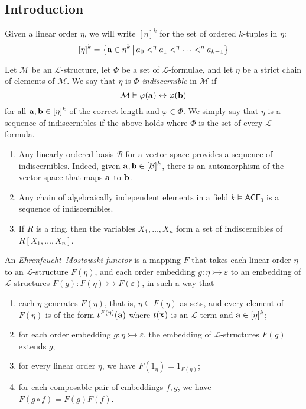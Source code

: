 \subsection{Introduction}
Given a linear order \( \eta \), we will write \( [\eta]^k \) for the set of ordered \( k \)-tuples in \( \eta \):
\[ [\eta]^k = \qty{\vb a \in \eta^k \,\middle|\,a_0 <^\eta a_1 <^\eta \dots <^\eta a_{k-1}} \]
\begin{definition}
	Let \( \mathcal M \) be an \( \mathcal L \)-structure, let \( \Phi \) be a set of \( \mathcal L \)-formulae, and let \( \eta \) be a strict chain of elements of \( \mathcal M \).
	We say that \( \eta \) is \emph{\( \Phi \)-indiscernible} in \( \mathcal M \) if
	\[ \mathcal M \vDash \varphi(\vb a) \leftrightarrow \varphi(\vb b) \]
	for all \( \vb a, \vb b \in [\eta]^k \) of the correct length and \( \varphi \in \Phi \).
	We simply say that \( \eta \) is a sequence of indiscernibles if the above holds where \( \Phi \) is the set of every \( \mathcal L \)-formula.
\end{definition}
\begin{example}
	\begin{enumerate}
		\item Any linearly ordered basis \( \mathcal B \) for a vector space provides a sequence of indiscernibles.
			Indeed, given \( \vb a, \vb b \in [\mathcal B]^k \), there is an automorphism of the vector space that maps \( \vb a \) to \( \vb b \).
		\item Any chain of algebraically independent elements in a field \( k \vDash \mathsf{ACF}_0 \) is a sequence of indiscernibles.
		\item If \( R \) is a ring, then the variables \( X_1, \dots, X_n \) form a set of indiscernibles of \( R[X_1, \dots, X_n] \).
	\end{enumerate}
\end{example}
\begin{definition}
	An \emph{Ehrenfeucht--Mostowski functor} is a mapping \( F \) that takes each linear order \( \eta \) to an \( \mathcal L \)-structure \( F(\eta) \), and each order embedding \( g : \eta \rightarrowtail \varepsilon \) to an embedding of \( \mathcal L \)-structures \( F(g) : F(\eta) \rightarrowtail F(\varepsilon) \), in such a way that
	\begin{enumerate}
		\item each \( \eta \) generates \( F(\eta) \), that is, \( \eta \subseteq F(\eta) \) as sets, and every element of \( F(\eta) \) is of the form \( t^{F(\eta)}(\vb a) \) where \( t(\vb x) \) is an \( \mathcal L \)-term and \( \vb a \in [\eta]^k \);
		\item for each order embedding \( g : \eta \rightarrowtail \varepsilon \), the embedding of \( \mathcal L \)-structures \( F(g) \) extends \( g \);
		\item for every linear order \( \eta \), we have \( F(1_\eta) = 1_{F(\eta)} \);
		\item for each composable pair of embeddings \( f, g \), we have \( F(g\circ f) = F(g)F(f) \).
	\end{enumerate}
\end{definition}
